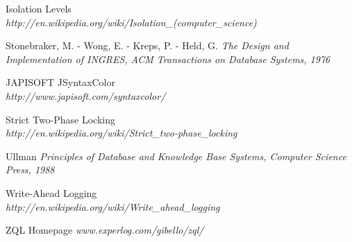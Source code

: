 \begin{thebibliography}{99}
  Isolation Levels \\ \emph{http://en.wikipedia.org/wiki/Isolation\_(computer\_science)}

  Stonebraker, M. - Wong, E. - Kreps, P. - Held, G. \emph{The Design and Implementation of INGRES, ACM Transactions on Database Systems, 1976}
 
  JAPISOFT JSyntaxColor \\ \emph{http://www.japisoft.com/syntaxcolor/}

  Strict Two-Phase Locking\\ \emph{http://en.wikipedia.org/wiki/Strict\_two-phase\_locking}
 
  Ullman \emph{Principles of Database and Knowledge Base Systems, Computer Science Press, 1988}

  Write-Ahead Logging \\ \emph{http://en.wikipedia.org/wiki/Write\_ahead\_logging}
 
  ZQL Homepage \emph{www.experlog.com/gibello/zql/}
 
\end{thebibliography}
